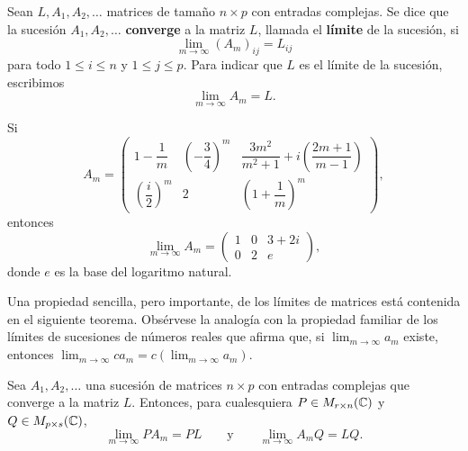 \documentclass[12pt,a4paper]{book}
\begin{document}
    \begin{definicion}
        Sean $L,A_1,A_2,\dots$ matrices de tamaño $n\times p$ con entradas complejas. Se dice que la sucesión $A_1,A_2,\dots$ \textbf{converge} a la matriz $L$, llamada el \textbf{límite} de la sucesión, si
        \begin{equation*}
            \lim_{m\to\infty}(A_m)_{ij}=L_{ij}
        \end{equation*}
        para todo $1\leq i\leq n$ y $1\leq j\leq p$. Para indicar que $L$ es el límite de la sucesión, escribimos
        \begin{equation*}
            \lim_{m\to\infty}A_m=L.
        \end{equation*}
    \end{definicion}

    \begin{ejemplo}
        Si
        \begin{equation*}
            A_m=\begin{pmatrix}
                1-\dfrac1m & \left(-\dfrac34\right)^{m} & \dfrac{3m^2}{m^2+1}+i\left(\dfrac{2m+1}{m-1}\right) \\[2ex]
                \left(\dfrac{i}{2}\right)^{m} & 2 & \left(1+\dfrac1m\right)^{m}
            \end{pmatrix},
        \end{equation*}
        entonces
        \begin{equation*}
            \lim_{m\to\infty}A_m=\begin{pmatrix}1&0&3+2i\\0&2&e\end{pmatrix},
        \end{equation*}
        donde $e$ es la base del logaritmo natural.
    \end{ejemplo}

    Una propiedad sencilla, pero importante, de los límites de matrices está contenida en el siguiente teorema. Obsérvese la analogía con la propiedad familiar de los límites de sucesiones de números reales que afirma que, si $\lim_{m\to\infty}a_m$ existe, entonces $\lim_{m\to\infty}ca_m=c\left(\lim_{m\to\infty}a_m\right)$.

    \begin{teorema}
        Sea $A_1,A_2,\dots$ una sucesión de matrices $n\times p$ con entradas complejas que converge a la matriz $L$. Entonces, para cualesquiera $P\in M_{r\times n}(\mathbb{C})$ y $Q\in M_{p\times s}(\mathbb{C})$,
        \begin{equation*}
            \lim_{m\to\infty}PA_m=PL \qquad\text{y}\qquad \lim_{m\to\infty}A_mQ=LQ.
        \end{equation*}
    \end{teorema}
\end{document}
